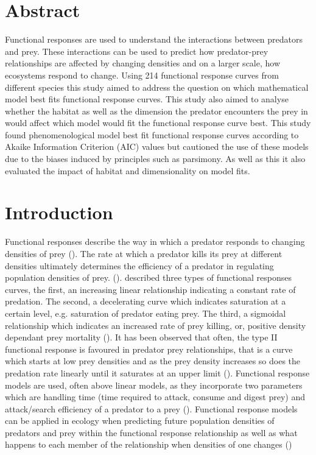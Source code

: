 \documentclass[11pt]{article}
\begin{document}
		\section*{Abstract}
	\noindent
	Functional responses are used to understand the interactions between predators and prey. These interactions can be used to predict how predator-prey relationships are affected by changing densities and on a larger scale, how ecosystems respond to change. Using 214 functional response curves from different species this study aimed to address the question on which mathematical model best fits functional response curves. This study also aimed to analyse whether the habitat as well as the dimension the predator encounters the prey in would affect which model would fit the functional response curve best. This study found phenomenological model best fit functional response curves according to Akaike Information Criterion (AIC) values but cautioned the use of these models due to the biases induced by principles such as parsimony. As well as this it also evaluated the impact of habitat and dimensionality on model fits. 
	
	\section*{Introduction}
	\noindent

	
Functional responses describe the way in which a predator responds to changing densities of prey (\cite{Holling1959}). The rate at which a predator kills its prey at different densities ultimately determines the efficiency of a predator in regulating population densities of prey. (\cite{Murdoch1975}). \cite{Holling1959} described three types of functional responses curves, the first, an increasing linear relationship indicating a constant rate of predation. The second, a decelerating curve which indicates saturation at a certain level, e.g. saturation of predator eating prey. The third, a sigmoidal relationship which indicates an increased rate of prey killing, or, positive density dependant prey mortality (\cite{Pervez2005}). It has been observed that often, the type II functional response is favoured in predator prey relationships, that is a curve which starts at low prey densities and as the prey density increases so does the predation rate linearly until it saturates at an upper limit (\cite{Jeschke2002}). Functional response models are used, often above linear models, as they incorporate two parameters which are handling time (time required to attack, consume and digest prey) and attack/search efficiency of a predator to a prey (\cite{Fathipour2016}). Functional response models can be applied in ecology when predicting future population densities of predators and prey within the functional response relationship as well as what happens to each member of the relationship when densities of one changes (\cite{Jeschke2002})
\end{document}
